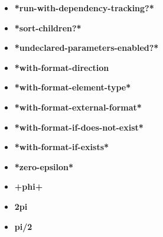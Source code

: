 \documentclass [11pt]{book}
\begin{document}
\begin{itemize}
\item {}
\label{prim:*run-with-dependency-tracking?*}
\textbf{*run-with-dependency-tracking?*}





\item {}
\label{prim:*sort-children?*}
\textbf{*sort-children?*}





\item {}
\label{prim:*undeclared-parameters-enabled?*}
\textbf{*undeclared-parameters-enabled?*}





\item {}
\label{prim:*with-format-direction}
\textbf{*with-format-direction}





\item {}
\label{prim:*with-format-element-type*}
\textbf{*with-format-element-type*}





\item {}
\label{prim:*with-format-external-format*}
\textbf{*with-format-external-format*}





\item {}
\label{prim:*with-format-if-does-not-exist*}
\textbf{*with-format-if-does-not-exist*}





\item {}
\label{prim:*with-format-if-exists*}
\textbf{*with-format-if-exists*}





\item {}
\label{prim:*zero-epsilon*}
\textbf{*zero-epsilon*}





\item {}
\label{prim:+phi+}
\textbf{+phi+}





\item {}
\label{prim:2pi}
\textbf{2pi}





\item {}
\label{prim:pi/2}
\textbf{pi/2}





\end{itemize}
\end{document}
